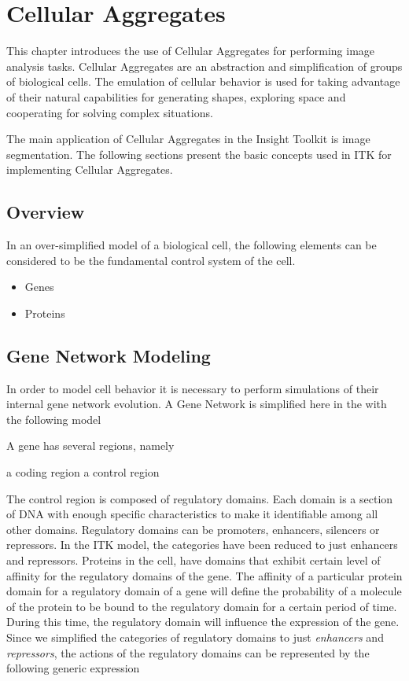 
\chapter{Cellular Aggregates}

This chapter introduces the use of Cellular Aggregates for performing image
analysis tasks. Cellular Aggregates are an abstraction and simplification of
groups of biological cells. The emulation of cellular behavior is used for
taking advantage of their natural capabilities for generating shapes, exploring
space and cooperating for solving complex situations.

The main application of Cellular Aggregates in the Insight Toolkit is image
segmentation. The following sections present the basic concepts used in ITK for
implementing Cellular Aggregates.

\section{Overview}

In an over-simplified model of a biological cell, the following elements can be
considered to be the fundamental control system of the cell.

\begin{itemize}
\item Genes
\item Proteins
\end{itemize}

\section{Gene Network Modeling}

In order to model cell behavior it is necessary to perform simulations of their
internal gene network evolution. A Gene Network is simplified here in the with the
following model

A gene has several regions, namely

a coding region
a control region

The control region is composed of regulatory domains. Each domain is a section
of DNA with enough specific characteristics to make it identifiable among all
other domains.  Regulatory domains can be promoters, enhancers, silencers or
repressors.  In the ITK model, the categories have been reduced to just
enhancers and repressors.  Proteins in the cell, have domains that exhibit
certain level of affinity for the regulatory domains of the gene. The affinity
of a particular protein domain for a regulatory domain of a gene will define
the probability of a molecule of the protein to be bound to the regulatory
domain for a certain period of time.  During this time, the regulatory domain
will influence the expression of the gene. Since we simplified the categories
of regulatory domains to just \emph{enhancers} and \emph{repressors}, the
actions of the regulatory domains can be represented by the following generic
expression

